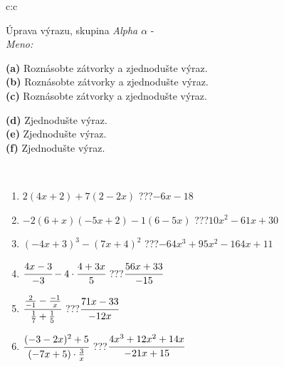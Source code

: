 \documentclass[10pt]{report}
\begin{document}
\thispagestyle{empty}
\begin{tabular}{c:c}
\begin{minipage}[c][104.5mm][t]{0.5\linewidth}
\begin{center}
\vspace{7mm}
{\huge Úprava výrazu, skupina \textit{Alpha $\alpha$} -}\\[5mm]
\textit{Meno:}\phantom{xxxxxxxxxxxxxxxxxxxxxxxxxxxxxxxxxxxxxxxxxxxxxxxxxxxxxxxxxxxxxxxxx}\\[5mm]
\begin{minipage}{0.95\linewidth}
\begin{center}
{\small \begin{minipage}{0.6\textwidth}
\textbf{(a)} Roznásobte zátvorky a zjednodušte výraz. \\[1mm]
\textbf{(b)} Roznásobte zátvorky a zjednodušte výraz. \\[1mm]
\textbf{(c)} Roznásobte zátvorky a zjednodušte výraz.
\end{minipage} \begin{minipage}{0.39\textwidth}
\textbf{(d)} Zjednodušte výraz. \\[1mm]
\textbf{(e)} Zjednodušte výraz. \\[1mm]
\textbf{(f)} Zjednodušte výraz.
\end{minipage}
}
\end{center}
\end{minipage}
\\[4mm]
\begin{minipage}{0.79\linewidth}
\begin{center}
\begin{varwidth}{\linewidth}
\begin{enumerate}
\normalsize
\item $2(4x+2)+7(2-2x)$\quad \dotfill\; ???\;\dotfill \quad $-6x-18$
\item $-2(6+x)(-5x+2)-1(6-5x)$\quad \dotfill\; ???\;\dotfill \quad $10x^2-61x+30$
\item $(-4x+3)^3-(7x+4)^2$\quad \dotfill\; ???\;\dotfill \quad $-64x^3+95x^2-164x+11$
\item $\cfrac{4x-3}{-3}-4\cdot\cfrac{4+3x}{5}$\quad \dotfill\; ???\;\dotfill \quad $\cfrac{56x+33}{-15}$
\item $\cfrac{\frac{2}{-1}-\frac{-1}{x}}{\frac{1}{7}+\frac{1}{5}}$\quad \dotfill\; ???\;\dotfill \quad $\cfrac{71x-33}{-12x}$
\item $\cfrac{(-3-2x)^2+5}{(-7x+5)\cdot\frac{3}{x}}$\quad \dotfill\; ???\;\dotfill \quad $\cfrac{4x^3+12x^2+14x}{-21x+15}$

\end{enumerate}
\end{varwidth}
\end{center}
\end{minipage}
\end{center}
\end{minipage}
\end{tabular}
\end{document}
